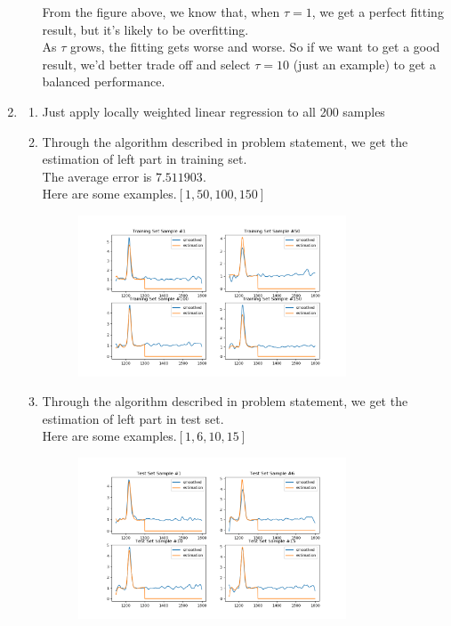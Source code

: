 \documentclass[12pt]{article}
\begin{document}
\begin{enumerate}[label=(\alph*)]
\begin{enumerate}[label=(\roman*)]
\begin{figure}[H]
        \end{figure}
        From the figure above, we know that, when $\tau = 1$, we get a perfect fitting result, but it's likely to be overfitting.\\
        As $\tau$ grows, the fitting gets worse and worse. So if we want to get a good result, we'd better trade off and select $\tau = 10$ (just an example) to get a balanced performance.

    \end{enumerate}
    \item
    \begin{enumerate}[label=(\roman*)]
        \item Just apply locally weighted linear regression to all 200 samples
        \item Through the algorithm described in problem statement, we get the estimation of left part in training set.
        \\ The average error is $7.511903$.
        \\ Here are some examples.$[1, 50, 100, 150]$
        \begin{figure}[H]
            \centering
            \includegraphics[width=0.80\textwidth]{figure/Regression4Quasar/c_ii.png}
        \end{figure}
        \item  Through the algorithm described in problem statement, we get the estimation of left part in test set.
        \\ Here are some examples.$[1, 6, 10, 15]$
        \begin{figure}[H]
            \centering
            \includegraphics[width=0.80\textwidth]{figure/Regression4Quasar/c_iii.png}
        \end{figure}
    \end{enumerate}

    \end{enumerate}  
\end{document}
